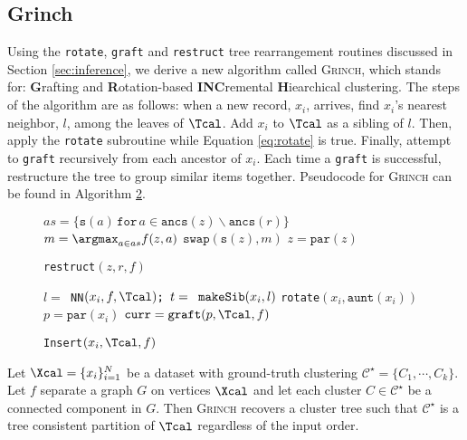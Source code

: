 \documentclass{article} \usepackage[utf8]{inputenc} \usepackage[T1]{fontenc}    \usepackage{hyperref}       \usepackage{url}            \usepackage{booktabs}       \usepackage{amsfonts}       \usepackage{nicefrac}       \usepackage{microtype}      \usepackage{geometry}
\newcommand{\alg}{\textsc{Grinch}\xspace}
\newcommand{\cstar}{\ensuremath{\mathcal{C}^\star}}
\newcommand{\graft}{\texttt{graft}\xspace}
\newcommand{\rotate}{\texttt{rotate}\xspace}
\newcommand{\rst}{\texttt{restruct}\xspace}
\newcommand{\ancs}[1]{\ensuremath{\texttt{ancs}(#1)}}
\newcommand{\sib}[1]{\ensuremath{\texttt{s}}(#1)\xspace}
\newcommand{\parent}[1]{\ensuremath{\texttt{par}}(#1)\xspace}
\newcommand{\aunt}[1]{\ensuremath{\texttt{aunt}}(#1)\xspace}
\begin{document}
\subsection{Grinch}
\label{sec:implementation}
Using the \rotate, \graft and \rst tree rearrangement routines discussed in
Section \ref{sec:inference}, we derive a new algorithm called \alg,
which stands for: \textbf{G}rafting and \textbf{R}otation-based
\textbf{INC}remental \textbf{H}iearchical clustering.  The steps of
the algorithm are as follows: when a new record, $x_i$, arrives, find
$x_i$'s nearest neighbor, $l$, among the leaves of $\Tcal$. Add $x_i$
to $\Tcal$ as a sibling of $l$.  Then, apply the \rotate subroutine
while Equation \ref{eq:rotate} is true. Finally, attempt to \graft
recursively from each ancestor of $x_i$.  Each time a \graft is
successful, restructure the tree to group similar items
together. Pseudocode for \alg can be found in Algorithm \ref{fig:alg}.

\begin{figure}
\begin{algorithm}[H]
   \caption{\texttt{restruct}$(z, r, f)$}
   \label{alg:restruct}
\begin{algorithmic}
  \STATE $as = \{\sib{a}\, \texttt{for}\, a \in \ancs{z} \backslash \ancs{r}\}$
  \STATE $m = \argmax_{a \in as} f(z, a)$
  \IF{$f(z, \sib{z})\, <\, f(z, m)$}
    \STATE $\texttt{swap}(\sib{z}, m)$
  \ENDIF
  \STATE $z = \parent{z}$
  \ENDWHILE
\end{algorithmic}
\end{algorithm}
\end{figure} \begin{figure}
\begin{algorithm}[H]
   \caption{\texttt{Insert}$(x_i , \Tcal, f)$}
   \label{fig:alg}
\begin{algorithmic}
   \STATE $l = $\texttt{ NN}$(x_i, f, \Tcal) \texttt{; } t = \texttt{ makeSib}(x_i, l)$
   \WHILE{$f(x_i, \sib{x_i}) < f(\aunt{x_i}, \sib{x_i})$}
   \STATE \rotate$(x_i, \aunt{x_i})$
   \ENDWHILE
   \STATE $p = \parent{x_i}$
   \STATE $\texttt{curr} = \graft(p, \Tcal, f)$
   \ENDWHILE
\end{algorithmic}
\end{algorithm}
\end{figure} 
\begin{theorem}
\label{thm:hsep}
Let $\Xcal = \{x_i\}_{i=1}^{N}$ be a dataset with ground-truth
clustering $\cstar = \{C_1, \cdots, C_k\}$. Let $f$ separate a graph
$G$ on vertices $\Xcal$ and let each cluster $C \in \cstar$ be a
connected component in $G$.  Then \alg recovers a cluster tree such
that $\cstar$ is a tree consistent partition of $\Tcal$ regardless of
the input order.
\end{theorem}
\end{document}
